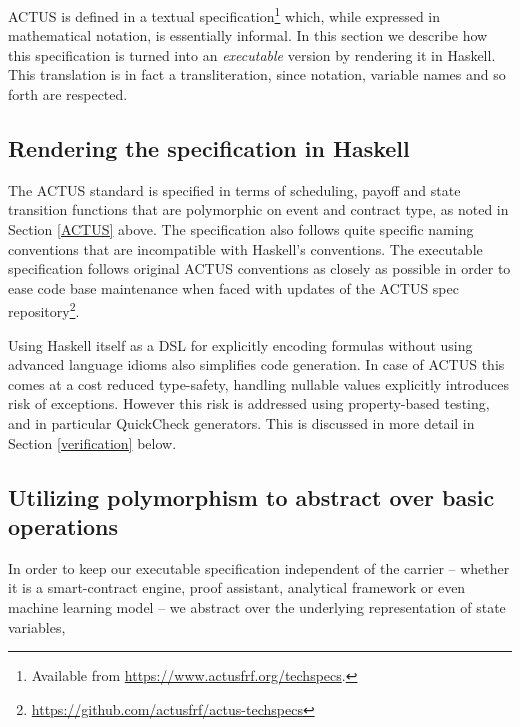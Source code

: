 \documentclass[runningheads]{llncs}
\begin{document}
ACTUS is defined in a textual specification\footnote{Available from \url{https://www.actusfrf.org/techspecs}.} which, while expressed in mathematical notation, is essentially informal. In this section we describe how this specification is turned into an \emph{executable} version by rendering it in Haskell. This translation is in fact a transliteration, since notation, variable names and so forth are respected.

\subsection{Rendering the specification in Haskell}

The ACTUS standard is specified in terms of scheduling, payoff and
state transition functions that are polymorphic on event and contract
type, as noted in Section \ref{ACTUS} above. The specification also follows quite specific naming conventions
that are incompatible with Haskell's conventions. The executable specification
follows original ACTUS conventions as closely as possible in order to
ease code base maintenance when faced with updates of the ACTUS
spec repository\footnote{\url{https://github.com/actusfrf/actus-techspecs}}.

Using Haskell itself as a DSL for explicitly encoding formulas without
using advanced language idioms also simplifies code generation. 
In case of ACTUS this comes at a cost reduced type-safety, handling nullable
values explicitly introduces risk of exceptions. However this risk
is addressed using property-based testing, and in particular QuickCheck generators. This is discussed in more detail in Section \ref{verification} below.

\subsection{Utilizing polymorphism to abstract over basic operations}

In order to keep our executable specification independent of the carrier -- whether it is a smart-contract engine, proof assistant, analytical framework
or even machine learning model -- we abstract over the underlying representation
of state variables,
\end{document}
